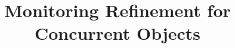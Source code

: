\documentclass[pldi,10pt,nocopyrightspace]{sigplanconf}
\title{Monitoring Refinement for Concurrent Objects}
\begin{document}
  \maketitle

  \begin{abstract}

  \end{abstract}

  
  
  
  
  
  
  
  
  
  
  
  
\end{document}
